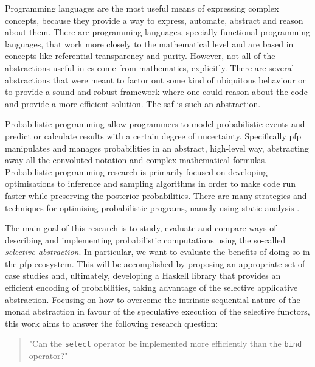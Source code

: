 \documentclass[
  oneside,
  11pt, a4paper,
  footinclude=true,
  headinclude=true,
  cleardoublepage=empty
]{scrbook}
\theoremstyle{definition}
\theoremstyle{definition}
\begin{document}
	Programming languages are the most useful means of expressing complex concepts, because they provide a way to express, automate, abstract and reason about them. There are programming languages, specially functional programming languages, that work more closely to the mathematical level and are based in concepts like referential transparency and purity. 
	However, not all of the abstractions useful in \gls{cs} come from mathematics, explicitly. There are several abstractions that were meant to factor out some kind of ubiquitous behaviour or to provide a sound and robust framework where one could reason about the code and provide a more efficient solution. The \gls{saf} is such an abstraction.
	    
	Probabilistic programming allow programmers to model probabilistic events and predict or calculate results with a certain degree of uncertainty. Specifically \gls{pfp} manipulates and manages probabilities in an abstract, high-level way, abstracting away all the convoluted notation and complex mathematical formulas. Probabilistic programming research is primarily focused on developing optimisations to inference and sampling algorithms in order to make code run faster while preserving the posterior probabilities. There are many strategies and techniques for optimising probabilistic programs, namely using static analysis \citep{bernstein2019static}.
    
    The main goal of this research is to study, evaluate and compare ways of describing and implementing probabilistic computations using the so-called \emph{selective abstraction}. In particular, we want to evaluate the benefits of doing so in the \gls{pfp} ecosystem. This will be accomplished by proposing an appropriate set of case studies and, ultimately, developing a Haskell library that provides an efficient encoding of probabilities, taking advantage of the selective applicative abstraction. Focusing on how to overcome the intrinsic sequential nature of the monad abstraction \citep{Scibior:2015:PPP:2887747.2804317} in favour of the speculative execution of the selective functors, this work aims to answer the following research question:
        \begin{quote}
        "Can the \texttt{select} operator be implemented more efficiently than the \texttt{bind} operator?"
        \end{quote}

		
\end{document}
